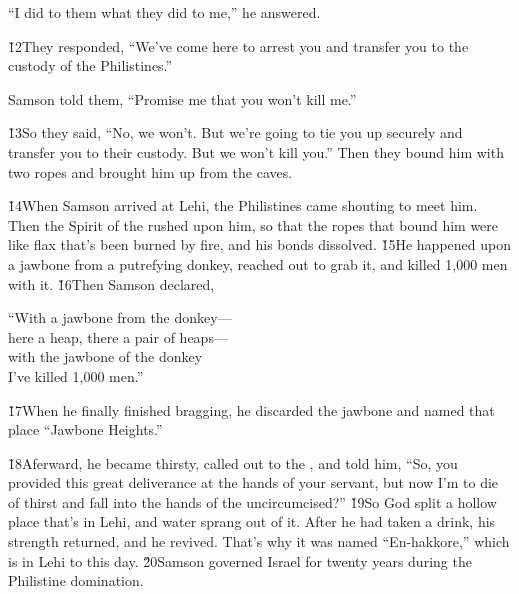 ``I did to them what they did to me,'' he answered.

\v{12}They responded, ``We've come here to arrest you and transfer you to the custody of the Philistines.''

Samson told them, ``Promise me that you won't kill me.''

\v{13}So they said, ``No, we won't. But we're going to tie you up securely and transfer you to their custody. But we won't kill you.'' Then they bound him with two ropes and brought him up from the caves.

\v{14}When Samson arrived at Lehi, the Philistines came shouting to meet him. Then the Spirit of the  rushed upon him, so that the ropes that bound him were like flax that's been burned by fire, and his bonds dissolved. \v{15}He happened upon a jawbone from a putrefying donkey, reached out to grab it, and killed 1,000 men with it. \v{16}Then Samson declared,

\begin{poetry}
\poeml ``With a jawbone from the donkey--- \\
\poemll    here a heap, there a pair of heaps--- \\
\poeml with the jawbone of the donkey \\
\poemll    I've killed 1,000 men.''
\end{poetry}

\v{17}When he finally finished bragging, he discarded the jawbone and named that place ``Jawbone Heights.''

\v{18}Aferward, he became thirsty, called out to the , and told him, ``So, you provided this great deliverance at the hands of your servant, but now I'm to die of thirst and fall into the hands of the uncircumcised?'' \v{19}So God split a hollow place that's in Lehi, and water sprang out of it. After he had taken a drink, his strength returned, and he revived. That's why it was named ``En-hakkore,'' which is in Lehi to this day. \v{20}Samson governed Israel for twenty years during the Philistine domination.

